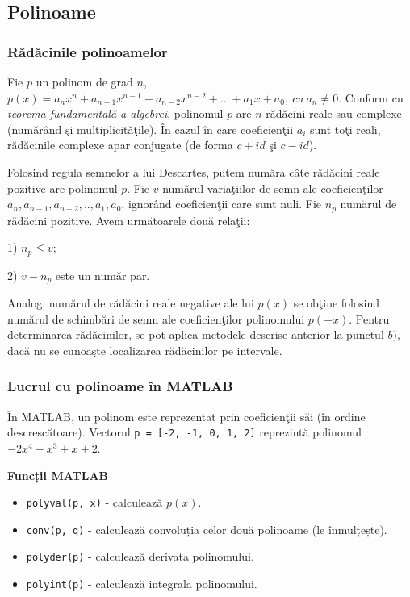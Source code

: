 \documentclass{exam}
\begin{document}
\subsection{Polinoame}

\subsubsection{Rădăcinile polinoamelor}

Fie $p$ un polinom de grad $n$, $p(x)= a_{n}x^{n}+a_{n-1}x^{n-1}+a_{n-2}x^{n-2}+...+a_{1}x+a_{0}, \: cu \: a_{n}\neq 0$.
Conform cu \textit{teorema fundamentală a algebrei}, polinomul $p$ are $n$ rădăcini reale sau complexe (numărând şi multiplicităţile). În cazul în care coeficienţii $a_{i}$ sunt toţi reali,  rădăcinile complexe apar conjugate (de forma $c+id$ şi $c-id$).

Folosind regula semnelor a lui Descartes, putem număra câte rădăcini reale pozitive are polinomul $p$. Fie $v$ numărul variaţiilor de semn ale coeficienţilor $a_{n}, a_{n-1}, a_{n-2},.., a_{1},a_{0}$, ignorând coeficienţii care sunt nuli. Fie $n_{p}$ numărul de rădăcini pozitive. Avem următoarele două relaţii:

1) $n_{p}\leq v;$

2) $v-n_{p}$ este un număr par.

Analog, numărul de rădăcini reale negative ale lui $p(x)$ se obţine folosind numărul de schimbări de semn ale coeficienţilor polinomului  $p(-x)$.
Pentru determinarea rădăcinilor, se pot aplica metodele descrise anterior la punctul $b)$, dacă nu se cunoaşte localizarea rădăcinilor pe intervale.

\subsubsection{Lucrul cu polinoame în MATLAB}

În MATLAB, un polinom este reprezentat prin coeficienţii săi (în ordine descrescătoare). Vectorul \verb|p = [-2, -1, 0, 1, 2]| reprezintă polinomul $-2x^{4}-x^{3}+x+2$.

\textbf{Funcții MATLAB}
\begin{itemize}
	\item \verb|polyval(p, x)| - calculează $p(x)$.
	\item \verb|conv(p, q)| - calculează convoluția celor două polinoame (le înmulțește).
	\item \verb|polyder(p)| - calculează derivata polinomului.
	\item \verb|polyint(p)| - calculează integrala polinomului.
\end{itemize}
\end{document}
